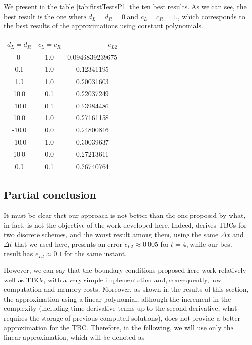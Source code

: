 \indent We present in the table \ref{tab:firstTestsP1} the ten best results. As we can see, the best result is the one where $d_L = d_R = 0$ and $c_L = c_R = 1. $, which corresponds to the best results of the approximations using constant polynomials.

\begin{center}
\begin{tabular}{c|c|S[round-precision=4,table-number-alignment =  left]}
	  &  &  \\
	. & 1.0 & 0.0946839239675 \\
	0.1 & 1.0 & 0.12341195 \\
	1.0 & 1.0 & 0.20031603 \\
	10.0 & 0.1 & 0.22037249 \\
	-10.0 & 0.1 & 0.23984486 \\
	10.0 & 1.0 & 0.27161158 \\
	-10.0 &  0.0 & 0.24800816\\
	-10.0 & 1.0 & 0.30039637 \\
	10.0 & 0.0 & 0.27213611 \\
	0.0 & 0.1 & 0.36740764
\end{tabular}
\end{center}

\subsection{Partial conclusion}

\indent It must be clear that our approach is not better than the one proposed by \cite{besse2015} what, in fact, is not the objective of the work developed here. Indeed, \cite{besse2015} derives TBCs for two discrete schemes, and the worst result among them, using the same $\Delta x $ and $\Delta t$ that we used here, presents an error $e_{L2} \approx 0.005$ for $t = 4$, while our best result has $e_{L2} \approx 0.1$ for the same instant.

\indent However, we can say that the boundary conditions proposed here work relatively well as TBCs, with a very simple implementation and, consequently, low computation and memory costs. Moreover, as shown in the results of this section, the approximation using a linear polynomial, although the increment in the complexity (including time derivative terms up to the second derivative, what requires the storage of previous computed solutions), does not provide a better approximation for the TBC. Therefore, in the following, we will use only the linear approximation, which will be denoted as  

